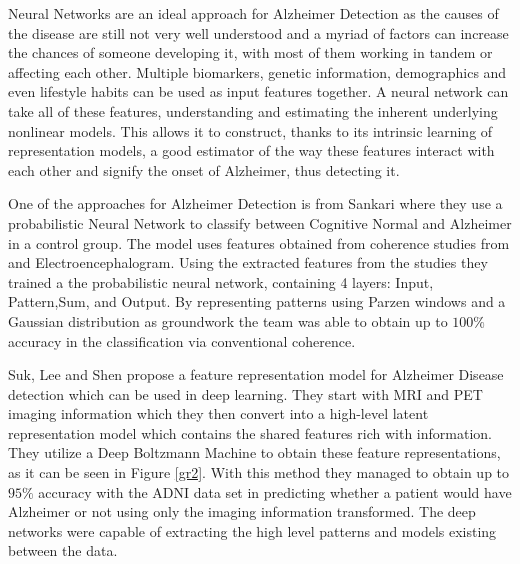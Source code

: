 Neural Networks are an ideal approach for Alzheimer Detection as the causes of the disease are still not very well understood and a myriad of factors can increase the chances of someone developing it, with most of them working in tandem or affecting each other. Multiple biomarkers, genetic information, demographics and even lifestyle habits can be used as input features together. A neural network can take all of these features, understanding and estimating the inherent underlying nonlinear models. This allows it to construct, thanks to its intrinsic learning of representation models, a good estimator of the way these features interact with each other and signify the onset of Alzheimer, thus detecting it.

One of the approaches for Alzheimer Detection is from Sankari\cite{SANKARI2011165} where they use a probabilistic Neural Network to classify between Cognitive Normal and Alzheimer in a control group. The model uses features obtained from coherence studies from and Electroencephalogram. Using the extracted features from the studies they trained a the probabilistic neural network, containing 4 layers: Input, Pattern,Sum, and Output. By representing patterns using Parzen windows and a Gaussian distribution as groundwork the team was able to obtain up to $100\%$ accuracy in the classification via conventional coherence.

Suk, Lee and Shen\cite{Suk2014} propose a feature representation model for Alzheimer Disease detection which can be used in deep learning. They start with MRI and PET imaging information which they then convert into a high-level latent representation model which contains the shared features rich with information. They utilize a Deep Boltzmann Machine to obtain these feature representations, as it can be seen in Figure \ref{gr2}. With this method they managed to obtain up to $95\%$ accuracy with the ADNI data set in predicting whether a patient would have Alzheimer or not using only the imaging information transformed. The deep networks were capable of extracting the high level patterns and models existing between the data.

